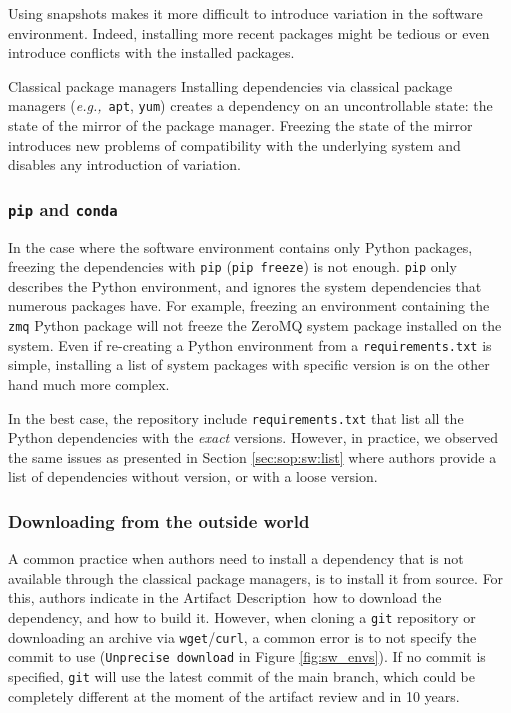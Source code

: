 \documentclass[sigconf,natbib=false]{acmart}
\newcommand{\eg}{\emph{e.g.,}}
\newcommand{\ad}{Artifact Description}
\begin{document}
Using snapshots makes it more difficult to introduce variation in the software environment.
Indeed, installing more recent packages might be tedious or even introduce conflicts with the installed packages.


\begin{lesson}{Classical package managers}{}
  Installing dependencies via classical package managers (\eg\ \texttt{apt}, \texttt{yum}) creates a dependency on an uncontrollable state: the state of the mirror of the package manager.
  Freezing the state of the mirror introduces new problems of compatibility with the underlying system and disables any introduction of variation.
\end{lesson}

\subsubsection{\texttt{pip} and \texttt{conda}}

In the case where the software environment contains only Python packages, freezing the dependencies with \texttt{pip} (\texttt{pip freeze}) is not enough.
\texttt{pip} only describes the Python environment, and ignores the system dependencies that numerous packages have. 
For example, freezing an environment containing the \texttt{zmq} Python package will not freeze the ZeroMQ system package installed on the system.  
Even if re-creating a Python environment from a \texttt{requirements.txt} is simple, installing a list of system packages with specific version is on the other hand much more complex.

In the best case, the repository include \texttt{requirements.txt} that list all the Python dependencies with the \emph{exact} versions.
However, in practice, we observed the same issues as presented in Section \ref{sec:sop:sw:list} where authors provide a list of dependencies without version, or with a loose version.

\subsubsection{Downloading from the outside world}

A common practice when authors need to install a dependency that is not available through the classical package managers, is to install it from source.
For this, authors indicate in the \ad\ how to download the dependency, and how to build it.
However, when cloning a \texttt{git} repository or downloading an archive via \texttt{wget}/\texttt{curl}, a common error is to not specify the commit to use (\texttt{Unprecise download} in Figure \ref{fig:sw_envs}).
If no commit is specified, \texttt{git} will use the latest commit of the main branch, which could be completely different at the moment of the artifact review and in 10 years.
\end{document}
